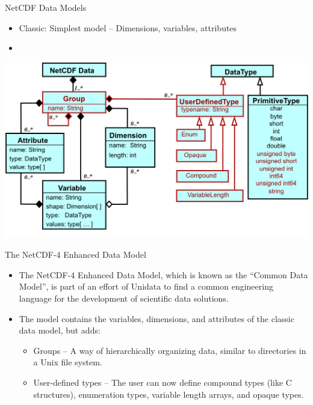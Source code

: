 \documentclass[compress,11pt,xcolor=svgnames,aspectratio=169]{beamer}
\begin{document}
\begin{frame}[t]{NetCDF Data Models}

    \begin{itemize}

        \item Classic: Simplest model -- Dimensions, variables, attributes

        \item {\color{red}{Enhanced: More powerful model -- Adds groups, types, nesting}}

    \end{itemize}

    \begin{center}
    \includegraphics[scale=0.45]{fig/nc4-uml}
    \end{center}

\nocite{netcdf}

\end{frame}

\begin{frame}[t]{The NetCDF-4 Enhanced Data Model}

\begin{itemize}
\setlength\itemsep{0.4cm}

    \item The NetCDF-4 Enhanced Data Model, which is known as the ``Common Data Model'', is part of an effort of Unidata to find a common engineering language for the development of scientific data solutions.

    \item The model contains the variables, dimensions, and attributes of the classic data model, but adds:

    \begin{itemize}

        \item Groups -- A way of hierarchically organizing data, similar to directories in a Unix file system.\\[0.2cm]

        \item User-defined types -- The user can now define compound types (like C structures), enumeration types, variable length arrays, and opaque types.

    \end{itemize}

\end{itemize}

\nocite{netcdf}

\end{frame}
\end{document}

